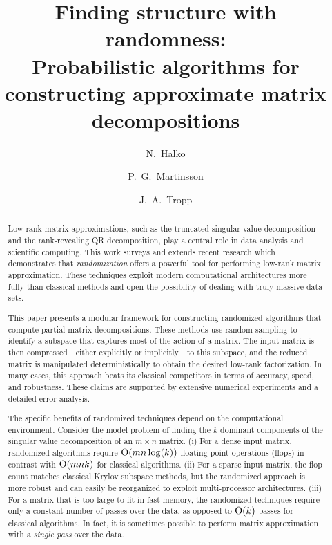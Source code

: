 \documentclass[final]{siamltex}
\title{Finding structure with randomness:\\ Probabilistic algorithms for
constructing approximate matrix decompositions}
\author{N.~Halko\footnotemark[2]
\and P.~G.~Martinsson\footnotemark[2]
\and J.~A.~Tropp\footnotemark[3]}
\newcounter{algorithm}[section]
\begin{document}
\maketitle

\renewcommand{\thefootnote}{\fnsymbol{footnote}}



\renewcommand{\thefootnote}{\arabic{footnote}}


\begin{abstract}
Low-rank matrix approximations, such as the truncated singular value
decomposition and the rank-revealing QR decomposition, play a central
role in data analysis and scientific computing. This work surveys and
extends
recent research which demonstrates that \emph{randomization} offers a
powerful tool for performing low-rank matrix approximation.
These
techniques exploit modern computational architectures
more fully than classical methods and open the possibility of
dealing with truly massive data sets.

This paper presents a modular framework for constructing randomized
algorithms that compute partial matrix decompositions. These methods
use random sampling
to identify a subspace that captures most of the action
of a matrix. The input matrix is then compressed---either explicitly
or implicitly---to this subspace, and the reduced matrix is
manipulated deterministically to obtain the desired low-rank
factorization. In many cases, this approach beats its classical
competitors in terms of accuracy, speed, and robustness.
These claims
are supported by extensive numerical experiments and a detailed error
analysis.

The specific benefits of randomized techniques depend on the
computational environment. Consider the model problem of finding
the $k$ dominant components of the singular value decomposition
of an $m \times n$ matrix.
(i) For a dense input matrix, randomized algorithms require $\mathrm{O}(mn
\log(k))$ floating-point operations (flops) in contrast with $
\mathrm{O}(mnk)$ for classical algorithms.
%
(ii) For a sparse input matrix, the flop count matches classical
Krylov subspace methods, but the randomized approach is more robust
and can easily be reorganized to exploit multi-processor architectures.
(iii) For a matrix that is too large to fit in fast memory, the randomized
techniques require only a constant number of passes over the data,
as opposed to $\mathrm{O}(k)$ passes for classical algorithms.
In fact, it is sometimes possible to perform matrix approximation with a
\emph{single pass} over the data.


\end{abstract}
\end{document}
